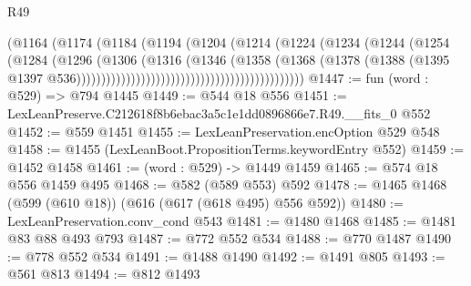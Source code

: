 \begin{lexlean}{R49}
\begin{coremodule}
                                                        (@1164
                                                          (@1174
                                                            (@1184
                                                              (@1194
                                                                (@1204
                                                                  (@1214
                                                                    (@1224
                                                                      (@1234
                                                                        (@1244
                                                                          (@1254
                                                                            (@1284
                                                                              (@1296
                                                                                (@1306
                                                                                  (@1316
                                                                                    (@1346
                                                                                      (@1358
                                                                                        (@1368
                                                                                          (@1378
                                                                                            (@1388
                                                                                              (@1395
                                                                                                @1397
                                                                                                @536))))))))))))))))))))))))))))))))))))))))))))))
@1447 := fun (word : @529) => @794 @1445
@1449 := @544 @18 @556
@1451 := LexLeanPreserve.C212618f8b6ebac3a5c1e1dd0896866e7.R49.__fits_0 @552
@1452 := @559 @1451
@1455 := LexLeanPreservation.encOption @529 @548
@1458 := @1455 (LexLeanBoot.PropositionTerms.keywordEntry @552)
@1459 := @1452 @1458
@1461 := (word : @529) -> @1449 @1459
@1465 := @574 @18 @556 @1459 @495
@1468 := @582 (@589 @553) @592
@1478 := @1465 @1468 (@599 (@610 @18)) (@616 (@617 (@618 @495) @556 @592))
@1480 := LexLeanPreservation.conv_cond @543
@1481 := @1480 @1468
@1485 := @1481 @83 @88 @493 @793
@1487 := @772 @552 @534
@1488 := @770 @1487
@1490 := @778 @552 @534
@1491 := @1488 @1490
@1492 := @1491 @805
@1493 := @561 @813
@1494 := @812 @1493

\end{coremodule}
\end{lexlean}
